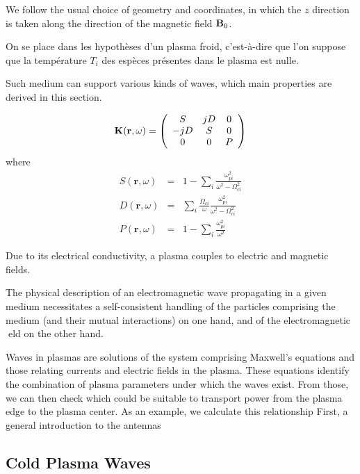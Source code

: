 We follow the usual choice of geometry and coordinates, in which the $z$ direction is taken along the direction of the magnetic field ${\mathbf B}_0$.  

On se place dans les hypothèses d'un plasma froid, c'est-à-dire que
l'on suppose que la température $T_{i}$ des espèces présentes dans
le plasma est nulle\cite[chap.5]{Brambilla1998}.




Such medium can support various kinds of waves, which main properties are derived in this section. 

\begin{equation}
{\mathbf K}({\mathbf r},\omega)
=
\left(\begin{array}{ccc}
	S & j D & 0\\
	-j D & S & 0\\
	0 & 0 & P
\end{array}\right)
\label{eq:tenseur_K_bis}
\end{equation}
where
\begin{eqnarray}
S(\mathbf{r},\omega) 
	& = & 
	1-\sum_{i}\frac{\omega_{pi}^{2}}{\omega^{2}-\Omega_{ci}^{2}}
\label{eq:stix_S}
\\
D(\mathbf{r},\omega) 
	& = & 
	\sum_{i}\frac{\Omega_{ci}}{\omega}\frac{\omega_{pi}^{2}}{\omega^{2}-\Omega_{ci}^{2}}
\label{eq:stix_D}
\\
P(\mathbf{r},\omega) 
	& = & 
	1-\sum_{i}\frac{\omega_{pi}^{2}}{\omega^{2}}
\label{eq:stix_P}
\end{eqnarray}

Due to its electrical conductivity, a plasma couples to electric and magnetic fields. 

The physical description of an electromagnetic wave propagating in a given medium
necessitates a self-consistent handling of the particles comprising the medium (and
their mutual interactions) on one hand, and of the electromagnetic eld on the other
hand.


Waves in plasmas are solutions of the system comprising Maxwell's equations and those relating currents and electric fields in the plasma. These
equations identify the combination of plasma parameters under which the waves
exist. From those, we can then check which could be suitable to transport power
from the plasma edge to the plasma center.
As an example, we calculate this relationship
First, a general introduction to the 
antennas

\subsection{Cold Plasma Waves}

